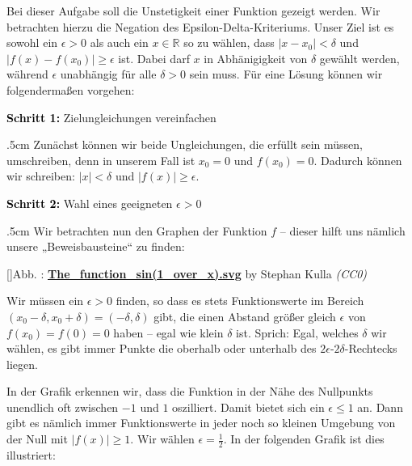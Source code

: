 \documentclass[fontsize=9pt,
               parskip=half-,
               DIV=14,
               listof=chapterentry,
               tocflat]{scrbook}
\newcounter{imagelabel}
\newenvironment{indentblock}{\begin{adjustwidth}{.5cm}{}}{\end{adjustwidth}}
\newcommand{\proofstep}[1]{\textbf{\textcolor{Black}{#1}}}
\begin{document}
\begin{solutionprocess*}
Bei dieser Aufgabe soll die Unstetigkeit einer Funktion gezeigt werden. Wir betrachten hierzu die Negation des Epsilon-Delta-Kriteriums. Unser Ziel ist es sowohl ein $\epsilon >0$ als auch ein $x\in \mathbb {R} $ so zu wählen, dass $|x-x_{0}|<\delta $ und $|f(x)-f(x_{0})|\geq \epsilon $ ist. Dabei darf $x$ in Abhänigigkeit von $\delta $ gewählt werden, während $\epsilon $ unabhängig für alle $\delta >0$ sein muss. Für eine Lösung können wir folgendermaßen vorgehen:

\proofstep{Schritt 1:}
 Zielungleichungen vereinfachen\begin{indentblock}
Zunächst können wir beide Ungleichungen, die erfüllt sein müssen, umschreiben, denn in unserem Fall ist $x_{0}=0$ und $f(x_{0})=0$. Dadurch können wir schreiben: $|x|<\delta $ und $|f(x)|\geq \epsilon $.

\end{indentblock}

\proofstep{Schritt 2:}
 Wahl eines geeigneten $\epsilon >0$\begin{indentblock}
Wir betrachten nun den Graphen der Funktion $f$ – dieser hilft uns nämlich unsere „Beweisbausteine“ zu finden:

[]{Abb. : \protect\href{https://commons.wikimedia.org/wiki/File:The_function_sin(1_over_x).svg}{\textbf{The\allowbreak\_function\allowbreak\_sin(1\allowbreak\_over\allowbreak\_x).svg}} by Stephan Kulla \textit{(CC0)}}\begin{center}
\end{center}

Wir müssen ein $\epsilon >0$ finden, so dass es stets Funktionswerte im Bereich $(x_{0}-\delta ,x_{0}+\delta )=(-\delta ,\delta )$ gibt, die einen Abstand größer gleich $\epsilon $ von $f(x_{0})=f(0)=0$ haben – egal wie klein $\delta $ ist. Sprich: Egal, welches $\delta $ wir wählen, es gibt immer Punkte die oberhalb oder unterhalb des $2\epsilon $-$2\delta $-Rechtecks liegen.

In der Grafik erkennen wir, dass die Funktion in der Nähe des Nullpunkts unendlich oft zwischen $-1$ und $1$ oszilliert. Damit bietet sich ein $\epsilon \leq 1$ an. Dann gibt es nämlich immer Funktionswerte in jeder noch so kleinen Umgebung von der Null mit $|f(x)|\geq 1$. Wir wählen $\epsilon ={\tfrac {1}{2}}$. In der folgenden Grafik ist dies illustriert:


\end{indentblock}
\end{solutionprocess*}
\end{document}
